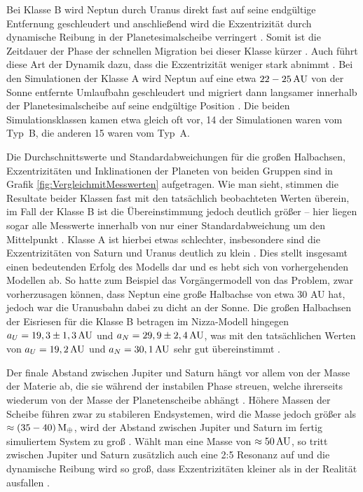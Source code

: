 \documentclass[12pt,a4paper,twoside,open=right,bibliography=totoc]{scrbook}
\renewcommand{\cite}{ \citep}
\newcommand{\ME}{M_\oplus}
\begin{document}
Bei Klasse B wird Neptun durch Uranus direkt fast auf seine endgültige Entfernung geschleudert 
und anschließend wird die Exzentrizität durch dynamische Reibung in der Planetesimalscheibe verringert\cite{Nesvorny2007}. Somit ist die Zeitdauer der Phase der schnellen Migration bei dieser Klasse kürzer\cite{Tsiganis2005}. Auch führt diese Art der Dynamik dazu, dass die Exzentrizität weniger stark abnimmt\cite{Tsiganis2005}.
Bei den Simulationen der Klasse A wird Neptun auf eine etwa $\unit[22-25]{AU}$ von der Sonne entfernte Umlaufbahn geschleudert und migriert dann langsamer innerhalb der Planetesimalscheibe auf seine endgültige Position\cite{Tsiganis2005}.
Die beiden Simulationsklassen kamen etwa gleich oft vor, 14 der Simulationen waren vom Typ~B, die anderen 15 waren vom Typ~A.

Die Durchschnittswerte und Standardabweichungen für die großen Halbachsen, Exzentrizitäten und Inklinationen der Planeten von beiden Gruppen sind in Grafik \ref{fig:VergleichmitMesswerten} aufgetragen. Wie man sieht, stimmen die Resultate beider Klassen fast mit den tatsächlich beobachteten Werten überein, im Fall der Klasse B ist die Übereinstimmung jedoch deutlich größer – hier liegen sogar alle Messwerte innerhalb von nur einer Standardabweichung um den Mittelpunkt\cite{Tsiganis2005}. Klasse A ist hierbei etwas schlechter, insbesondere sind die Exzentrizitäten von Saturn und Uranus deutlich zu klein\cite{Tsiganis2005,Nesvorny2007}. 
Dies stellt insgesamt einen bedeutenden Erfolg des Modells dar und es hebt sich von vorhergehenden Modellen ab.
So hatte zum Beispiel das Vorgängermodell von \cite{Gomes2004} das Problem, zwar vorherzusagen können, dass Neptun eine große Halbachse von etwa 30 AU hat, jedoch war die Uranusbahn dabei zu dicht an der Sonne.
Die großen Halbachsen der Eisriesen für die Klasse B betragen im Nizza-Modell hingegen $a_U = \unit[19,3 \pm 1,3]{AU}$ und $a_N = \unit[29,9 \pm 2,4]{AU}$, was mit den tatsächlichen Werten von $a_U = \unit[19,2]{AU}$ und $a_N = \unit[30,1]{AU}$ sehr gut übereinstimmt\cite{Tsiganis2005}.

Der finale Abstand zwischen Jupiter und Saturn hängt vor allem von der Masse der Materie ab,
die sie während der instabilen Phase streuen, welche ihrerseits wiederum von der Masse der Planetenscheibe abhängt\cite{Tsiganis2005}.
Höhere Massen der Scheibe führen zwar zu stabileren Endsystemen, wird die Masse jedoch größer als $\approx \unit[(35-40)]{\ME}$, wird der Abstand zwischen Jupiter und Saturn im fertig simuliertem System zu groß\cite{Tsiganis2005}. Wählt man eine Masse von $\approx \unit[50]{AU}$, so tritt zwischen Jupiter und Saturn zusätzlich auch eine 2:5 Resonanz auf und die dynamische Reibung wird so groß, dass Exzentrizitäten kleiner als in der Realität ausfallen\cite{Tsiganis2005}.
\end{document}
